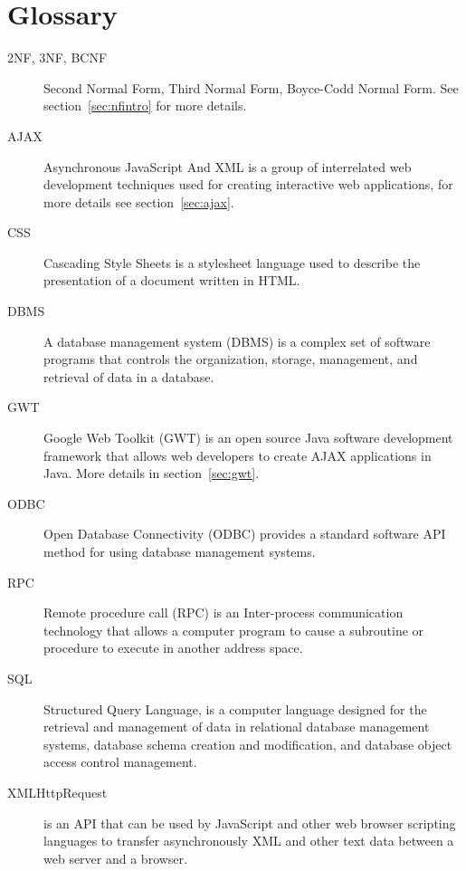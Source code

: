 \section{Glossary}
\begin{description}
	\item[2NF, 3NF, BCNF] Second Normal Form, Third Normal Form, Boyce-Codd Normal Form. See section~\ref{sec:nfintro} for more details.
	\item[AJAX] Asynchronous JavaScript And XML is a group of interrelated web development techniques used for creating interactive web applications, for more details see section~\ref{sec:ajax}.
	\item[CSS] Cascading Style Sheets is a stylesheet language used to describe the presentation of a document written in HTML.
	\item[DBMS] A database management system (DBMS) is a complex set of software programs that controls the organization, storage, management, and retrieval of data in a database.
	\item[GWT] Google Web Toolkit (GWT) is an open source Java software development framework that allows web developers to create AJAX applications in Java. More details in section~\ref{sec:gwt}.
	\item[ODBC] Open Database Connectivity (ODBC) provides a standard software API method for using database management systems.
	\item[RPC] Remote procedure call (RPC) is an Inter-process communication technology that allows a computer program to cause a subroutine or procedure to execute in another address space.
	\item[SQL] Structured Query Language, is a computer language designed for the retrieval and management of data in relational database management systems, database schema creation and modification, and database object access control management.
	\item[XMLHttpRequest] is an API that can be used by JavaScript and other web browser scripting languages to transfer asynchronously XML and other text data between a web server and a browser.
\end{description}
